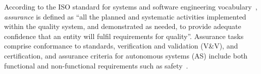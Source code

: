 \documentclass[runningheads]{llncs}
\begin{document}
According to the ISO standard for systems and software engineering vocabulary~\cite{ISO24765:2017}, \emph{assurance} is defined as ``all the planned and systematic activities implemented within the quality system, and demonstrated as needed, to provide adequate confidence that an entity will fulfil requirements for quality''.
%
Assurance tasks comprise conformance to standards, verification and validation (V\&V), and certification, and assurance criteria for autonomous systems (AS) include both functional and non-functional requirements such as safety~\cite{Cheng2014}. 


\end{document}
